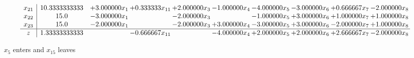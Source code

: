 \documentclass[10pt]{article}
\begin{document}
\[\begin{array}{c| c c@{\hskip 2pt} c@{\hskip 2pt} c@{\hskip 2pt} c@{\hskip 2pt} c@{\hskip 2pt} c@{\hskip 2pt} c@{\hskip 2pt} c@{\hskip 2pt} }
 x_{21}   &  10.3333333333 & + 3.000000 x_{1} & + 0.333333 x_{11} & + 2.000000 x_{3} & -1.000000 x_{4} & -4.000000 x_{5} & -3.000000 x_{6} & + 0.666667 x_{7} & -2.000000 x_{8}\\
 x_{22}   &  15.0 & -3.000000 x_{1} &   & -2.000000 x_{3} &   & -1.000000 x_{5} & + 3.000000 x_{6} & + 1.000000 x_{7} & + 1.000000 x_{8}\\
 x_{23}   &  15.0 & -2.000000 x_{1} &   & -2.000000 x_{3} & + 3.000000 x_{4} & -3.000000 x_{5} & + 3.000000 x_{6} & -2.000000 x_{7} & + 1.000000 x_{8}\\
\hline
z    &  1.33333333333  &   & -0.666667 x_{11} &   & -4.000000 x_{4} & + 2.000000 x_{5} & + 2.000000 x_{6} & + 2.666667 x_{7} & -2.000000 x_{8}\\
\end{array}\]


 $ x_{5} $ enters and $ x_{15} $ leaves 
\end{document}
